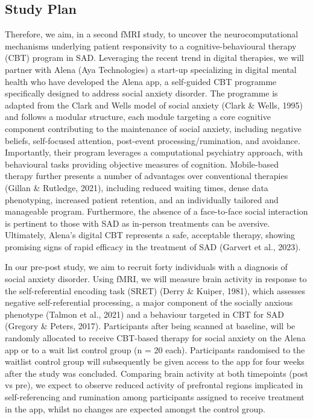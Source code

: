 \documentclass[12pt,a4paper,oneside,]{book} %
\begin{document}
\subsection{Study Plan}\label{study-plan-1}

Therefore, we aim, in a second fMRI study, to uncover the neurocomputational mechanisms underlying patient responsivity to a cognitive-behavioural therapy (CBT) program in SAD. Leveraging the recent trend in digital therapies, we will partner with Alena (Aya Technologies) a start-up specializing in digital mental health who have developed the Alena app, a self-guided CBT programme specifically designed to address social anxiety disorder. The programme is adapted from the Clark and Wells model of social anxiety (Clark \& Wells, 1995) and follows a modular structure, each module targeting a core cognitive component contributing to the maintenance of social anxiety, including negative beliefs, self-focused attention, post-event processing/rumination, and avoidance. Importantly, their program leverages a computational psychiatry approach, with behavioural tasks providing objective measures of cognition. Mobile-based therapy further presents a number of advantages over conventional therapies (Gillan \& Rutledge, 2021), including reduced waiting times, dense data phenotyping, increased patient retention, and an individually tailored and manageable program. Furthermore, the absence of a face-to-face social interaction is pertinent to those with SAD as in-person treatments can be aversive. Ultimately, Alena's digital CBT represents a safe, acceptable therapy, showing promising signs of rapid efficacy in the treatment of SAD (Garvert et al., 2023).

In our pre-post study, we aim to recruit forty individuals with a diagnosis of social anxiety disorder. Using fMRI, we will measure brain activity in response to the self-referential encoding task (SRET) (Derry \& Kuiper, 1981), which assesses negative self-referential processing, a major component of the socially anxious phenotype (Talmon et al., 2021) and a behaviour targeted in CBT for SAD (Gregory \& Peters, 2017). Participants after being scanned at baseline, will be randomly allocated to receive CBT-based therapy for social anxiety on the Alena app or to a wait list control group (n = 20 each). Participants randomised to the waitlist control group will subsequently be given access to the app for four weeks after the study was concluded. Comparing brain activity at both timepoints (post vs pre), we expect to observe reduced activity of prefrontal regions implicated in self-referencing and rumination among participants assigned to receive treatment in the app, whilst no changes are expected amongst the control group.
\end{document}
